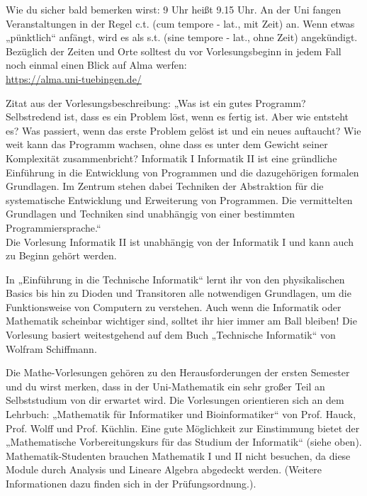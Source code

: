 Wie du sicher bald bemerken wirst: 9 Uhr heißt 9.15 Uhr. An der Uni fangen Veranstaltungen in der Regel c.t. (cum
tempore - lat., mit Zeit) an. Wenn etwas „pünktlich“ anfängt, wird es als s.t. (sine tempore - lat., ohne
Zeit) angekündigt.
Bezüglich der Zeiten und Orte solltest du vor Vorlesungsbeginn in jedem Fall noch einmal einen Blick auf Alma werfen:\\
\url{https://alma.uni-tuebingen.de/}

\ifbachelor
{}
Zitat aus der Vorlesungsbeschreibung: „Was ist ein gutes Programm? Selbstredend ist, dass es ein
Problem löst, wenn es fertig ist. Aber wie entsteht es? Was passiert, wenn das erste Problem gelöst
ist und ein neues auftaucht? Wie weit kann das Programm wachsen, ohne dass es unter dem Gewicht
seiner Komplexität zusammenbricht? 
\ifwintersemester
Informatik I 
\fi
\ifsommersemester
Informatik II
\fi 
ist eine gründliche Einführung in die Entwicklung
von Programmen und die dazugehörigen formalen Grundlagen. Im Zentrum stehen dabei Techniken der Abstraktion
für die systematische Entwicklung und Erweiterung von Programmen. Die vermittelten Grundlagen und Techniken
sind unabhängig von einer bestimmten Programmiersprache.“\\
\ifsommersemester
Die Vorlesung Informatik II ist unabhängig von der Informatik I und kann auch zu Beginn gehört werden.
\fi

\ifinfo
\ifwintersemester
{}
In „Einführung in die Technische Informatik“ lernt ihr von den physikalischen Basics bis hin zu Dioden und Transitoren alle notwendigen Grundlagen, um die Funktionsweise von Computern zu verstehen. Auch wenn die Informatik oder Mathematik scheinbar wichtiger sind, solltet ihr hier immer am Ball bleiben! Die Vorlesung basiert weitestgehend auf dem Buch „Technische Informatik“ von Wolfram Schiffmann.
\fi
\fi

Die Mathe-Vorlesungen gehören zu den Herausforderungen der ersten Semester und du wirst merken, dass in der Uni-Mathematik ein sehr großer Teil an Selbststudium von dir erwartet wird. Die Vorlesungen orientieren sich an dem Lehrbuch: „Mathematik für Informatiker und Bioinformatiker“ von Prof. Hauck, Prof. Wolff und Prof. Küchlin. Eine gute Möglichkeit zur Einstimmung bietet der „Mathematische Vorbereitungskurs für das Studium der Informatik“ (siehe oben). 
\iflehramt
Mathematik-Studenten brauchen Mathematik I
und II nicht besuchen, da diese Module durch Analysis und Lineare Algebra
abgedeckt werden. (Weitere Informationen dazu finden sich in der
Prüfungsordnung.).
\fi
\fi
